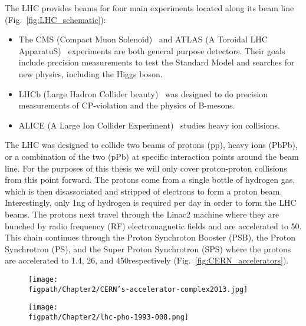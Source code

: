 The LHC provides beams for four main experiments located along its beam line (Fig.~\ref{fig:LHC_schematic}):
\begin{itemize}
    \item The CMS (Compact Muon Solenoid)~\cite{Chatrchyan:2008aa} and ATLAS (A Toroidal LHC ApparatuS)~\cite{1748-0221-3-08-S08003} experiments are both general purpose detectors. Their goals include precision measurements to test the Standard Model and searches for new physics, including the Higgs boson.
    \item LHCb (Large Hadron Collider beauty)~\cite{Alves:2008zz} was designed to do precision measurements of CP-violation and the physics of B-mesons.
    \item ALICE (A Large Ion Collider Experiment)~\cite{Aamodt:2008zz} studies heavy ion collisions.
\end{itemize}

The LHC was designed to collide two beams of protons (pp), heavy ions (PbPb), or a combination of the two (pPb) at specific interaction points around the beam line.
For the purposes of this thesis we will only cover proton-proton collisions from this point forward.
The protons come from a single bottle of hydrogen gas, which is then disassociated and stripped of electrons to form a proton beam.
Interestingly, only 1\unit{ng} of hydrogen is required per day in order to form the LHC beams.
The protons next travel through the Linac2 machine where they are bunched by radio frequency (RF) electromagnetic fields and are accelerated to 50\MeV.
This chain continues through the Proton Synchroton Booster (PSB), the Proton Synchrotron (PS), and the Super Proton Synchrotron (SPS) where the protons are accelerated to 1.4\GeV, 26\GeV, and 450\GeV respectively (Fig.~\ref{fig:CERN_accelerators}).

\begin{sidewaysfigure}[!hbt]
    \centering
    \begin{subfigure}[t]{0.4655\textwidth}
        \texttt{[image: \\figpath/Chapter2/CERN's-accelerator-complex2013.jpg]}
        \label{fig:CERN_accelerator_complex}
    \end{subfigure}
    \begin{subfigure}[t]{0.4655\textwidth}
        \texttt{[image: \\figpath/Chapter2/lhc-pho-1993-008.png]}
        \label{fig:LHC_LEP_injection_complex}
    \end{subfigure}
    \caption{Left: A schematic of the CERN accelerator complex~\cite{Marcastel:1621583}. Right: A diagram of the LHC injection chain. Also included is a diagram of the heavy ion and LEP injection chains~\cite{Jean-Luc:841568}.}
    \label{fig:CERN_accelerators}
\end{sidewaysfigure}

